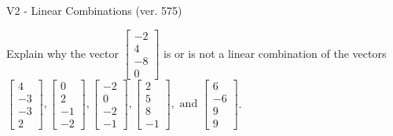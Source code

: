 \begin{exercise}
  \begin{exerciseTitle}V2 - Linear Combinations (ver. 575)\end{exerciseTitle}
  \begin{exerciseStatement}
    Explain why the vector \(\left[\begin{array}{c}
-2 \\
4 \\
-8 \\
0
\end{array}\right]\)  is or is not a linear 
	combination of the vectors \(\left[\begin{array}{c}
4 \\
-3 \\
-3 \\
2
\end{array}\right] , \left[\begin{array}{c}
0 \\
2 \\
-1 \\
-2
\end{array}\right] , \left[\begin{array}{c}
-2 \\
0 \\
-2 \\
-1
\end{array}\right] , \left[\begin{array}{c}
2 \\
5 \\
8 \\
-1
\end{array}\right] , \text{ and } \left[\begin{array}{c}
6 \\
-6 \\
9 \\
9
\end{array}\right]\).
	



\end{exerciseStatement}
\end{exercise}

